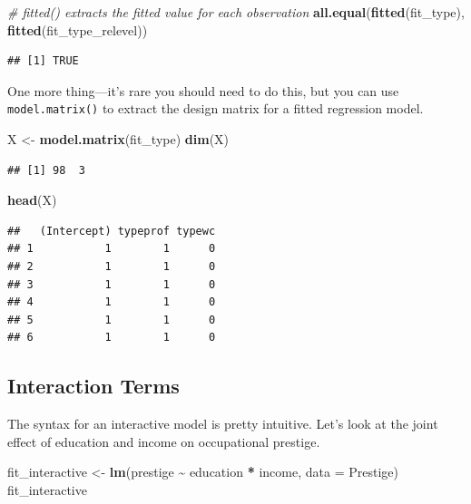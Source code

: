 \documentclass[
  12pt,
  oneside,openany]{book}
\newenvironment{Shaded}{\begin{snugshade}}{\end{snugshade}}
\newcommand{\CommentTok}[1]{\textcolor[rgb]{0.56,0.35,0.01}{\textit{#1}}}
\newcommand{\DataTypeTok}[1]{\textcolor[rgb]{0.13,0.29,0.53}{#1}}
\newcommand{\KeywordTok}[1]{\textcolor[rgb]{0.13,0.29,0.53}{\textbf{#1}}}
\newcommand{\NormalTok}[1]{#1}
\newcommand{\OperatorTok}[1]{\textcolor[rgb]{0.81,0.36,0.00}{\textbf{#1}}}
\newcommand{\StringTok}[1]{\textcolor[rgb]{0.31,0.60,0.02}{#1}}
\begin{document}
\begin{Shaded}
\begin{Highlighting}[]
\CommentTok{\# fitted() extracts the fitted value for each observation}
\KeywordTok{all.equal}\NormalTok{(}\KeywordTok{fitted}\NormalTok{(fit\_type), }\KeywordTok{fitted}\NormalTok{(fit\_type\_relevel))}
\end{Highlighting}
\end{Shaded}

\begin{verbatim}
## [1] TRUE
\end{verbatim}

One more thing---it's rare you should need to do this, but you can use \texttt{model.matrix()} to extract the design matrix for a fitted regression model.

\begin{Shaded}
\begin{Highlighting}[]
\NormalTok{X <{-}}\StringTok{ }\KeywordTok{model.matrix}\NormalTok{(fit\_type)}
\KeywordTok{dim}\NormalTok{(X)}
\end{Highlighting}
\end{Shaded}

\begin{verbatim}
## [1] 98  3
\end{verbatim}

\begin{Shaded}
\begin{Highlighting}[]
\KeywordTok{head}\NormalTok{(X)}
\end{Highlighting}
\end{Shaded}

\begin{verbatim}
##   (Intercept) typeprof typewc
## 1           1        1      0
## 2           1        1      0
## 3           1        1      0
## 4           1        1      0
## 5           1        1      0
## 6           1        1      0
\end{verbatim}

\hypertarget{interaction-terms-1}{%
\subsection{Interaction Terms}\label{interaction-terms-1}}

The syntax for an interactive model is pretty intuitive. Let's look at the joint effect of education and income on occupational prestige.

\begin{Shaded}
\begin{Highlighting}[]
\NormalTok{fit\_interactive <{-}}\StringTok{ }\KeywordTok{lm}\NormalTok{(prestige }\OperatorTok{\textasciitilde{}}\StringTok{ }\NormalTok{education }\OperatorTok{*}\StringTok{ }\NormalTok{income, }\DataTypeTok{data =}\NormalTok{ Prestige)}
\NormalTok{fit\_interactive}
\end{Highlighting}
\end{Shaded}
\end{document}

